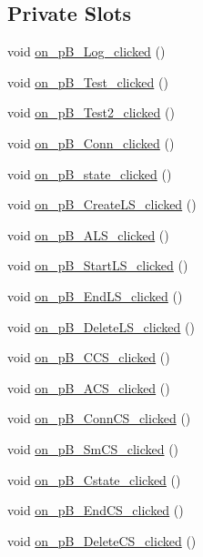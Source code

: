 \subsection*{Private Slots}
\begin{DoxyCompactItemize}
\item 
void \mbox{\hyperlink{class_main_window_a84aa93ec9c5ee1d57adb0837100602c2}{on\+\_\+p\+B\+\_\+\+Log\+\_\+clicked}} ()
\item 
void \mbox{\hyperlink{class_main_window_a709386f981b5ff7a66eb4e177731f763}{on\+\_\+p\+B\+\_\+\+Test\+\_\+clicked}} ()
\item 
void \mbox{\hyperlink{class_main_window_a5cfb8f6df71adadbe9db726fd717f58f}{on\+\_\+p\+B\+\_\+\+Test2\+\_\+clicked}} ()
\item 
void \mbox{\hyperlink{class_main_window_a232344f7a1d51e055f29c29ebc77b625}{on\+\_\+p\+B\+\_\+\+Conn\+\_\+clicked}} ()
\item 
void \mbox{\hyperlink{class_main_window_ac508398ff861dfde00e6e861cd492558}{on\+\_\+p\+B\+\_\+state\+\_\+clicked}} ()
\item 
void \mbox{\hyperlink{class_main_window_a40be111e98ea1e4353164f31189b09bf}{on\+\_\+p\+B\+\_\+\+Create\+L\+S\+\_\+clicked}} ()
\item 
void \mbox{\hyperlink{class_main_window_a9beac22b299a42ca488d18384be2aaf6}{on\+\_\+p\+B\+\_\+\+A\+L\+S\+\_\+clicked}} ()
\item 
void \mbox{\hyperlink{class_main_window_af5e65874a5cc4c9880134cc11279d7df}{on\+\_\+p\+B\+\_\+\+Start\+L\+S\+\_\+clicked}} ()
\item 
void \mbox{\hyperlink{class_main_window_a1838f674d42137802b51de5dcf240eb9}{on\+\_\+p\+B\+\_\+\+End\+L\+S\+\_\+clicked}} ()
\item 
void \mbox{\hyperlink{class_main_window_a445d582f73fbd30997386c7beac6d65e}{on\+\_\+p\+B\+\_\+\+Delete\+L\+S\+\_\+clicked}} ()
\item 
void \mbox{\hyperlink{class_main_window_a9be0d2006d6a2cc09a397bf3e656b16b}{on\+\_\+p\+B\+\_\+\+C\+C\+S\+\_\+clicked}} ()
\item 
void \mbox{\hyperlink{class_main_window_a76ed89ca7e0beb612aa818b948fa58df}{on\+\_\+p\+B\+\_\+\+A\+C\+S\+\_\+clicked}} ()
\item 
void \mbox{\hyperlink{class_main_window_a4dbd0c0d64bff1ba16da7327ba14ed1f}{on\+\_\+p\+B\+\_\+\+Conn\+C\+S\+\_\+clicked}} ()
\item 
void \mbox{\hyperlink{class_main_window_a892d590b189c370bb93b666632b4ddd0}{on\+\_\+p\+B\+\_\+\+Sm\+C\+S\+\_\+clicked}} ()
\item 
void \mbox{\hyperlink{class_main_window_a9479a9493ecfc10ea3baaab6aaa66cfe}{on\+\_\+p\+B\+\_\+\+Cstate\+\_\+clicked}} ()
\item 
void \mbox{\hyperlink{class_main_window_a2f15b6d411d90a29219165631529e9d9}{on\+\_\+p\+B\+\_\+\+End\+C\+S\+\_\+clicked}} ()
\item 
void \mbox{\hyperlink{class_main_window_a6e04e1c4b5948fde819cb39f8d073ec9}{on\+\_\+p\+B\+\_\+\+Delete\+C\+S\+\_\+clicked}} ()
\end{DoxyCompactItemize}
